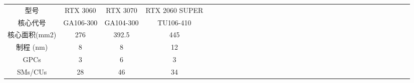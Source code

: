 \documentclass[a4paper]{article}
\begin{document}
\begin{table}[!htbp]
\centering
\begin{tabular}{|c|c|c|c|lllllllllllllllllllllllllllll}
\cline{1-4}
型号                                                          & RTX 3060                                                               & RTX 3070                                                               & RTX 2060 SUPER                                                                              &  &  &  &  &  &  &  &  &  &  &  &  &  &  &  &  &  &  &  &  &  &  &  &  &  &  &  &  &  \\ \cline{1-4}
核心代号                                                        & GA106-300                                                              & GA104-300                                                              & TU106-410                                                                                   &  &  &  &  &  &  &  &  &  &  &  &  &  &  &  &  &  &  &  &  &  &  &  &  &  &  &  &  &  \\ \cline{1-4}
核心面积(mm2)                                                   & 276                                                                    & 392.5                                                                  & 445                                                                                         &  &  &  &  &  &  &  &  &  &  &  &  &  &  &  &  &  &  &  &  &  &  &  &  &  &  &  &  &  \\ \cline{1-4}
制程 (nm)                                                     & 8                                                                      & 8                                                                      & 12                                                                                          &  &  &  &  &  &  &  &  &  &  &  &  &  &  &  &  &  &  &  &  &  &  &  &  &  &  &  &  &  \\ \cline{1-4}
GPCs                                                        & 3                                                                      & 6                                                                      & 3                                                                                           &  &  &  &  &  &  &  &  &  &  &  &  &  &  &  &  &  &  &  &  &  &  &  &  &  &  &  &  &  \\ \cline{1-4}
SMs/CUs                                                     & 28                                                                     & 46                                                                     & 34                                                                                          &  &  &  &  &  &  &  &  &  &  &  &  &  &  &  &  &  &  &  &  &  &  &  &  &  &  &  &  &  \\ \cline{1-4}

\end{tabular}
\end{table}
\end{document}
